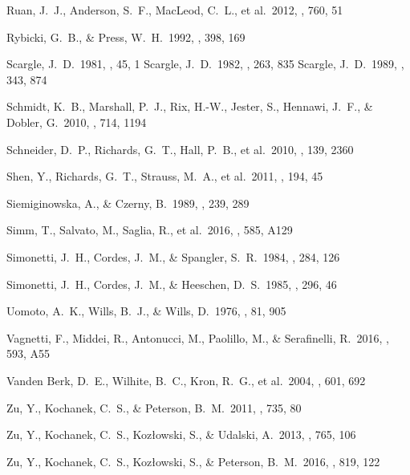\documentclass[twocolumn]{aastex6}
\begin{document}
\begin{thebibliography}{}
 Ruan, J.~J., Anderson, S.~F., MacLeod, C.~L., et al.\ 2012, \apj, 760, 51 

 Rybicki, G.~B., \& Press, W.~H.\ 1992, \apj, 398, 169

 Scargle, J.~D.\ 1981, \apjs, 45, 1 
 Scargle, J.~D.\ 1982, \apj, 263, 835 
 Scargle, J.~D.\ 1989, \apj, 343, 874

 Schmidt, K.~B., Marshall, P.~J., Rix, H.-W., Jester, S., Hennawi, J.~F., \& Dobler, G.\ 2010, \apj, 714, 1194 

 Schneider, D.~P., Richards, G.~T., Hall, P.~B., et al.\ 2010, \aj, 139, 2360 

 Shen, Y., Richards, G.~T., Strauss, M.~A., et al.\ 2011, \apjs, 194, 45 

 Siemiginowska, A., \& Czerny, B.\ 1989, \mnras, 239, 289 

 Simm, T., Salvato, M., Saglia, R., et al.\ 2016, \aap, 585, A129 

 Simonetti, J.~H., Cordes, J.~M., \& Spangler, S.~R.\ 1984, \apj, 284, 126 

 Simonetti, J.~H., Cordes, J.~M., \& Heeschen, D.~S.\ 1985, \apj, 296, 46 

 Uomoto, A.~K., Wills, B.~J., \& Wills, D.\ 1976, \aj, 81, 905 

 Vagnetti, F., Middei, R., Antonucci, M., Paolillo, M., \& Serafinelli, R.\ 2016, \aap, 593, A55 

 Vanden Berk, D.~E., Wilhite, B.~C., Kron, R.~G., et al.\ 2004, \apj, 601, 692

 Zu, Y., Kochanek, C.~S., \& Peterson, B.~M.\ 2011, \apj, 735, 80 

 Zu, Y., Kochanek, C.~S., Koz{\l}owski, S., \& Udalski, A.\ 2013, \apj, 765, 106

 Zu, Y., Kochanek, C.~S., Koz{\l}owski, S., \& Peterson, B.~M.\ 2016, \apj, 819, 122 

\end{thebibliography}
\end{document}
